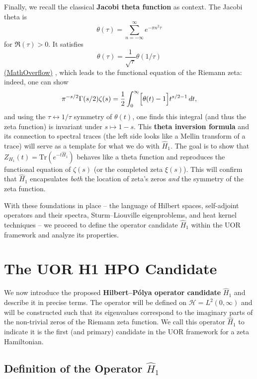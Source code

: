 \documentclass[12pt]{article}
\theoremstyle{plain}
\theoremstyle{definition}
\begin{document}
Finally, we recall the classical \textbf{Jacobi theta function} as context. The Jacobi theta is 
\[
\theta(\tau) = \sum_{n=-\infty}^{\infty} e^{-\pi n^2 \tau}
\]
for \(\Re(\tau)>0\). It satisfies 
\[
\theta(\tau) = \frac{1}{\sqrt{\tau}}\theta(1/\tau)
\]
\href{https://mathoverflow.net/questions/120067/what-do-theta-functions-have-to-do-with-quadratic-reciprocity#:~:text=arithmetic%20significance}{(MathOverflow)} , which leads to the functional equation of the Riemann zeta: indeed, one can show 
\[
\pi^{-s/2}\Gamma(s/2)\zeta(s) = \frac{1}{2}\int_0^\infty \Bigl[\theta(t) - 1\Bigr] t^{s/2 - 1}\,dt,
\]
and using the \(\tau\leftrightarrow1/\tau\) symmetry of \(\theta(t)\), one finds this integral (and thus the zeta function) is invariant under \(s\mapsto 1-s\). This \textbf{theta inversion formula} and its connection to spectral traces (the left side looks like a Mellin transform of a trace) will serve as a template for what we do with \(\hat{H}_1\). The goal is to show that \(Z_{H_1}(t) = \mathrm{Tr}(e^{-t\hat{H}_1})\) behaves like a theta function and reproduces the functional equation of \(\zeta(s)\) (or the completed zeta \(\xi(s)\)). This will confirm that \(\hat{H}_1\) encapsulates \emph{both} the location of zeta's zeros \emph{and} the symmetry of the zeta function.

With these foundations in place -- the language of Hilbert spaces, self-adjoint operators and their spectra, Sturm--Liouville eigenproblems, and heat kernel techniques -- we proceed to define the operator candidate \(\hat{H}_1\) within the UOR framework and analyze its properties.

\section{The UOR H1 HPO Candidate}

We now introduce the proposed \textbf{Hilbert--P\'olya operator candidate} \(\hat{H}_1\) and describe it in precise terms. The operator will be defined on \(\mathcal{H}=L^2(0,\infty)\) and will be constructed such that its eigenvalues correspond to the imaginary parts of the non-trivial zeros of the Riemann zeta function. We call this operator \(\hat{H}_1\) to indicate it is the first (and primary) candidate in the UOR framework for a zeta Hamiltonian.

\subsection{Definition of the Operator \(\hat{H}_1\)}
\end{document}
